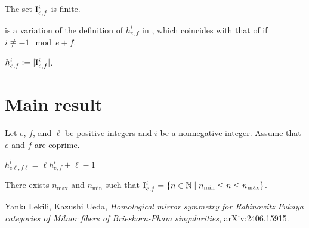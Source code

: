 
\begin{lemma}
\label{lem:setI_finite}
\leanok
The set $\mathrm{I}_{e,f}^i$ is finite.
\end{lemma}


 is a variation
of the definition of $h_{e,f}^i$ in \cite{2406.15915},
which coincides with that of \cite{2406.15915}
if $i \not \equiv -1 \mod e+f$.

\begin{definition}
\label{def:h}
\leanok
{}
$
h_{e,f}^i
:=
|\mathrm{I}_{e,f}^i|
$.
\end{definition}

\chapter{Main result}

Let $e$, $f$, and $\ell$ be positive integers
and $i$ be a nonnegative integer.
Assume that $e$ and $f$ are coprime.

\begin{proposition}[{\cite[Proposition 5.1]{2406.15915}}]
\label{prop:main}
$
h_{e \ell, f \ell}^i = \ell h_{e,f}^i + \ell - 1
$
\end{proposition}

\begin{lemma} \label{lem:I_is_interval}
There exists $n_{\max}$ and $n_{\min}$ such that
$\mathrm{I}_{e,f}^i = \{n \in \mathbb{N} \mid n_{\min} \le n \le n_{\max}\}$.
\end{lemma}

\begin{thebibliography}{LU}
Yank{\i} Lekili, Kazushi Ueda,
\emph{Homological mirror symmetry for Rabinowitz Fukaya categories
of Milnor fibers of Brieskorn-Pham singularities},
arXiv:2406.15915.
\end{thebibliography}